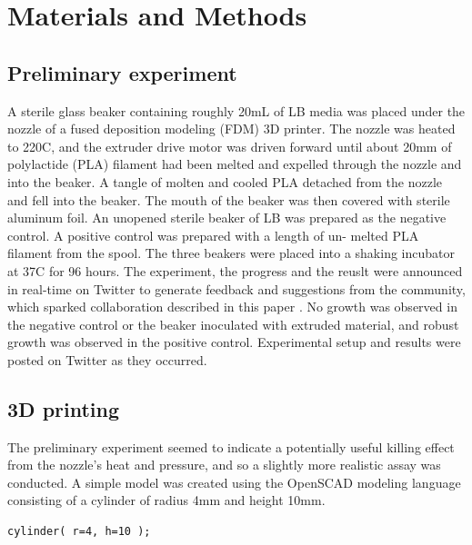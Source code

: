 \documentclass[fleqn,10pt]{wlpeerj}
\begin{document}
\section{Materials and Methods}

\subsection{Preliminary experiment}

A sterile glass beaker containing roughly 20mL of LB media was placed under
the nozzle of a fused deposition modeling (FDM) 3D printer. The nozzle was
heated to 220C, and the extruder drive motor was driven forward until about
20mm of polylactide (PLA) filament had been melted and expelled through the
nozzle and into the beaker. A tangle of molten and cooled PLA detached from
the nozzle and fell into the beaker. The mouth of the beaker was then covered
with sterile aluminum foil. An unopened sterile beaker of LB was prepared as
the negative control. A positive control was prepared with a length of un-
melted PLA filament from the spool. The three beakers were placed into a
shaking incubator at 37C for 96 hours. The experiment, the progress and the
reuslt were announced in real-time on Twitter to generate feedback and
suggestions from the community, which sparked collaboration described in this
paper \cite{tweet_conjecture, tweet_first_result_1, tweet_first_result_2,
tweet_2nd_test, tweet_2nd_result}. No growth was observed in the negative
control or the beaker inoculated with extruded material, and robust growth was
observed in the positive control. Experimental setup and results were posted
on Twitter as they occurred.

\subsection{3D printing}\label{3Dprinting}

The preliminary experiment seemed to indicate a potentially useful killing
effect from the nozzle’s heat and pressure, and so a slightly more realistic
assay was conducted. A simple model was created using the OpenSCAD
\cite{OpenSCAD} modeling language consisting of a cylinder of radius 4mm and
height 10mm.

\begin{verbatim}
cylinder( r=4, h=10 );
\end{verbatim}
\end{document}
